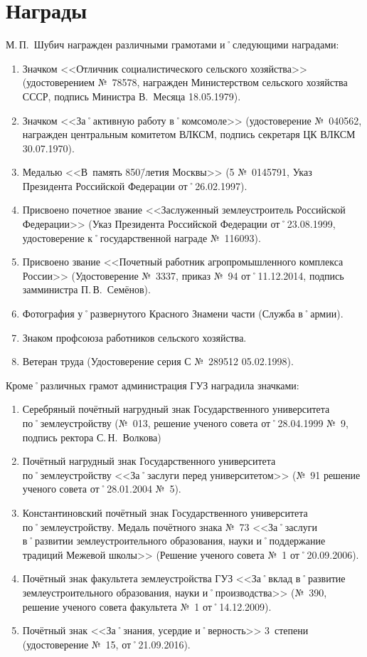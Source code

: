 ﻿\section{Награды}
\noindent М.\,П.~Шубич награжден различными грамотами и˚следующими наградами: 

\begin{enumerate}
	\item Значком <<Отличник социалистического сельского хозяйства>> (удостоверением №~78578, награжден Министерством сельского хозяйства СССР, подпись Министра В.~Месяца 18.05.1979).
	\item Значком <<За˚активную работу в˚комсомоле>> (удостоверение №~040562, награжден центральным комитетом ВЛКСМ, подпись секретаря ЦК ВЛКСМ 30.07.1970).
	\item Медалью <<В~память 850\=/летия Москвы>> (5 №~0145791, Указ Президента Российской Федерации от˚26.02.1997).
	\item Присвоено почетное звание <<Заслуженный землеустроитель Российской Федерации>> (Указ Президента Российской Федерации от˚23.08.1999, удостоверение к˚государственной награде №~116093).
	\item Присвоено звание <<Почетный работник агропромышленного комплекса России>> (Удостоверение №~3337, приказ №~94 от˚11.12.2014, подпись замминистра П.\,В.~Семёнов).
	\item Фотография у˚развернутого Красного Знамени части (Служба в˚армии).
	\item Знаком профсоюза работников сельского хозяйства.
	\item Ветеран труда (Удостоверение серия С №~289512 05.02.1998).
\end{enumerate}

\noindent Кроме˚различных грамот администрация ГУЗ наградила значками:
\begin{enumerate}	
	\item Серебряный почётный нагрудный знак Государственного университета по˚землеустройству (№~013, решение ученого совета от˚28.04.1999 №~9, подпись ректора С.\,Н.~Волкова) 
	\item Почётный нагрудный знак Государственного университета по˚землеустройству <<За˚заслуги перед университетом>> (№~91 решение ученого совета от˚28.01.2004 №~5).
	\item Константиновский почётный знак Государственного университета по˚землеустройству. Медаль почётного знака №~73 <<За˚заслуги в˚развитии землеустроительного образования, науки и˚поддержание традиций Межевой школы>> (Решение ученого совета №~1 от˚20.09.2006).
	\item Почётный знак факультета землеустройства ГУЗ <<За˚вклад в˚развитие землеустроительного образования, науки и˚производства>> (№~390, решение ученого совета факультета №~1 от˚14.12.2009).
	\item Почётный знак <<За˚знания, усердие и˚верность>> 3~степени (удостоверение №~15, от˚21.09.2016). 
\end{enumerate}